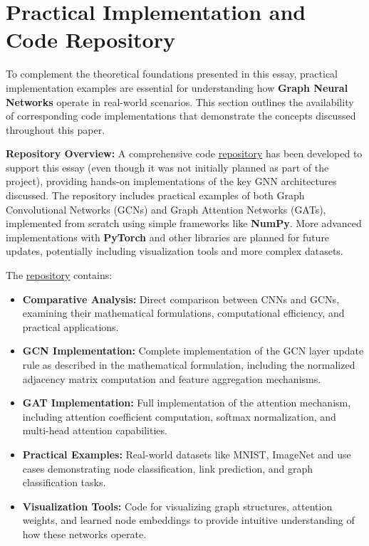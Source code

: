 \documentclass{article}
\begin{document}
\section{Practical Implementation and Code Repository}

To complement the theoretical foundations presented in this essay, practical implementation examples are essential for understanding how \textbf{Graph Neural Networks} operate in real-world scenarios.
This section outlines the availability of corresponding code implementations that demonstrate the concepts discussed throughout this paper.

\textbf{Repository Overview:} A comprehensive code \href{https://github.com/sl4shuur/graph-theory-in-ai}{repository} has been developed to support this essay (even though it was not initially planned as part of the project), providing hands-on implementations of the key GNN architectures discussed.
The repository includes practical examples of both Graph Convolutional Networks (GCNs) and Graph Attention Networks (GATs), implemented from scratch using simple frameworks like \textbf{NumPy}.
More advanced implementations with \textbf{PyTorch} and other libraries are planned for future updates, potentially including visualization tools and more complex datasets.

The \href{https://github.com/sl4shuur/graph-theory-in-ai}{repository} contains:
\begin{itemize}
      \item \textbf{Comparative Analysis:} Direct comparison between CNNs and GCNs, examining their mathematical formulations, computational efficiency, and practical applications.
      \item \textbf{GCN Implementation:} Complete implementation of the GCN layer update rule as described in the mathematical formulation, including the normalized adjacency matrix computation and feature aggregation mechanisms.
      \item \textbf{GAT Implementation:} Full implementation of the attention mechanism, including attention coefficient computation, softmax normalization, and multi-head attention capabilities.
      \item \textbf{Practical Examples:} Real-world datasets like MNIST, ImageNet and use cases demonstrating node classification, link prediction, and graph classification tasks.
      \item \textbf{Visualization Tools:} Code for visualizing graph structures, attention weights, and learned node embeddings to provide intuitive understanding of how these networks operate.
\end{itemize}
\end{document}
